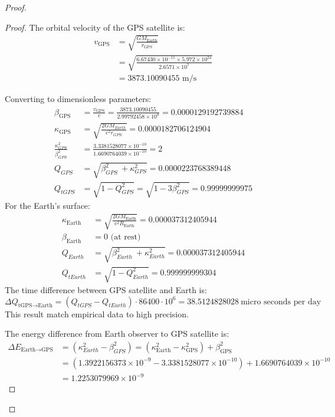 \documentclass{article}
\begin{document}
\begin{proof}
\begin{proof}
The orbital velocity of the GPS satellite is:
\begin{align}
v_{\text{GPS}} &= \sqrt{\frac{GM_{\text{Earth}}}{r_{\text{GPS}}}} \\
&= \sqrt{\frac{6.67430 \times 10^{-11} \times 5.972 \times 10^{24}}{2.6571 \times 10^7}} \\
&= 3873.10090455 \text{ m/s}
\end{align}

Converting to dimensionless parameters:
\begin{align}
\beta_{\text{GPS}} &= \frac{v_{\text{GPS}}}{c} = \frac{3873.10090455}{2.99792458 \times 10^8} =0.0000129192739884 \\
\kappa_{\text{GPS}} &= \sqrt{\frac{2GM_{Earth}}{c^2 r_{GPS}}} =0.0000182706124904 \\
\frac{\kappa_{GPS}^{2}}{\beta_{GPS}^{2}} &=\frac{3.3381528077\times10^{-10}}{1.6690764039\times10^{-10}}=2 \\
Q_{GPS} &=\sqrt{\beta_{GPS}^{2}\ +\kappa_{GPS}^{2}}=0.0000223768389448 \\
Q_{tGPS} &=\sqrt{1-Q_{GPS}^{2}}=\sqrt{1-3\beta_{GPS}^{2}}=0.99999999975
\end{align}
For the Earth's surface:
\begin{align}
\kappa_{\text{Earth}} &= \sqrt{\frac{2GM_{\text{Earth}}}{c^2 R_{\text{Earth}}}} = 0.000037312405944\\
\beta_{\text{Earth}} &= 0 \text{ (at rest)} \\
Q_{Earth} &=\sqrt{\beta_{Earth}^{2}\ +\kappa_{Earth}^{2}}=0.000037312405944 \\
Q_{tEarth} &=\sqrt{1-Q_{Earth}^{2}}=0.999999999304
\end{align}
The time difference between GPS satellite and Earth is:
\[
\Delta Q_{\text{tGPS} \rightarrow \text{Earth}}=(Q_{tGPS}-Q_{tEarth})\cdot 86400  \cdot  10^6  = 38.5124828028 \ \text{micro seconds per day}
\]
This result match empirical data to high precision.

The energy difference from Earth observer to GPS satellite is:
\begin{align}
\Delta E_{\text{Earth} \rightarrow \text{GPS}} &=\left(\kappa_{Earth}^{2}-\beta_{GPS}^{2}\right)= (\kappa^2_{\text{Earth}} - \kappa^2_{\text{GPS}}) + \beta^2_{\text{GPS}} \\
&= (1.3922156373\times10^{-9} - 3.3381528077\times10^{-10}) + 1.6690764039\times10^{-10} \\
&= 1.2253079969\times10^{-9}
\end{align}


\end{proof}
\end{proof}
\end{document}
